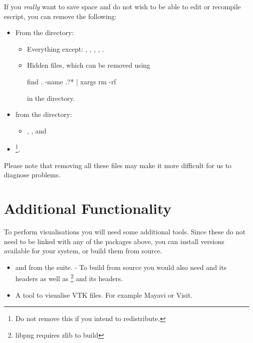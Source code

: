 If you \emph{really} want to save space and do not wish to be able to edit or recompile escript, you can remove the following:
\begin{itemize}
 \item From the  directory:\begin{itemize}
\item Everything except: , , , ,
.
\item Hidden files, which can be removed using
\begin{shellCode}
find . -name .?* | xargs rm -rf
\end{shellCode}
in the  directory.
\end{itemize}
\item from the  directory:
\begin{itemize}
\item  {}, ,  and 
\end{itemize}
\item {}\footnote{Do not remove this if you intend to redistribute.}.
\end{itemize}

Please note that removing all these files may make it more difficult for us to diagnose problems.




\section{Additional Functionality}\label{sec:linaddfunc}
To perform visualisations you will need some additional tools.
Since these do not need to be linked with any of the packages above, you can install versions available for your
system, or build them from source.
\begin{itemize}
\item {} and  from the  suite. - To build from source 
you would also need  and its headers as well as \footnote{libpng requires zlib to build} and its headers.
\item A tool to visualise VTK files. For example Mayavi or Visit.
\end{itemize}